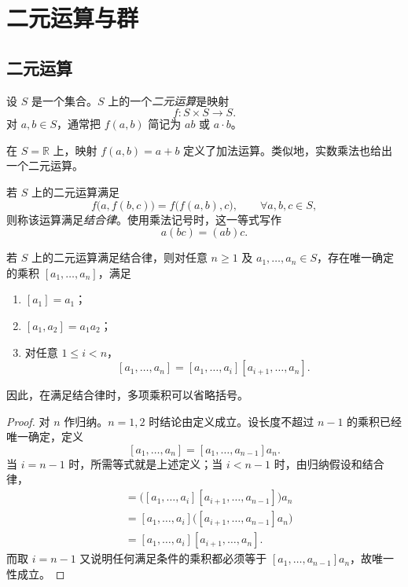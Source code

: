 \chapter{二元运算与群}

\section{二元运算}

\begin{definition}[二元运算]
设 $S$ 是一个集合。$S$ 上的一个\emph{二元运算}是映射
\[
  f\colon S\times S\longrightarrow S.
\]
对 $a,b\in S$，通常把 $f(a,b)$ 简记为 $ab$ 或 $a\cdot b$。
\end{definition}

\begin{example}
在 $S=\mathbb R$ 上，映射 $f(a,b)=a+b$ 定义了加法运算。类似地，实数乘法也给出一个二元运算。
\end{example}

\begin{definition}[结合律]
若 $S$ 上的二元运算满足
\[
  f\bigl(a,f(b,c)\bigr)=f\bigl(f(a,b),c\bigr),
  \qquad \forall a,b,c\in S,
\]
则称该运算满足\emph{结合律}。使用乘法记号时，这一等式写作
\[
  a(bc)=(ab)c.
\]
\end{definition}

\begin{theorem}[结合运算下乘积的唯一性]
若 $S$ 上的二元运算满足结合律，则对任意 $n\geq 1$ 及 $a_1,\dots,a_n\in S$，存在唯一确定的乘积
$[a_1,\dots,a_n]$，满足
\begin{enumerate}
  \item $[a_1]=a_1$；
  \item $[a_1,a_2]=a_1a_2$；
  \item 对任意 $1\leq i<n$，
  \[
    [a_1,\dots,a_n]
    =[a_1,\dots,a_i][a_{i+1},\dots,a_n].
  \]
\end{enumerate}
因此，在满足结合律时，多项乘积可以省略括号。
\end{theorem}

\begin{proof}
对 $n$ 作归纳。$n=1,2$ 时结论由定义成立。设长度不超过 $n-1$ 的乘积已经唯一确定，定义
\[
  [a_1,\dots,a_n]=[a_1,\dots,a_{n-1}]a_n.
\]
当 $i=n-1$ 时，所需等式就是上述定义；当 $i<n-1$ 时，由归纳假设和结合律，
\begin{align*}
  [a_1,\dots,a_n]
  &=\bigl([a_1,\dots,a_i][a_{i+1},\dots,a_{n-1}]\bigr)a_n\\
  &=[a_1,\dots,a_i]
    \bigl([a_{i+1},\dots,a_{n-1}]a_n\bigr)\\
  &=[a_1,\dots,a_i][a_{i+1},\dots,a_n].
\end{align*}
而取 $i=n-1$ 又说明任何满足条件的乘积都必须等于
$[a_1,\dots,a_{n-1}]a_n$，故唯一性成立。
\end{proof}

